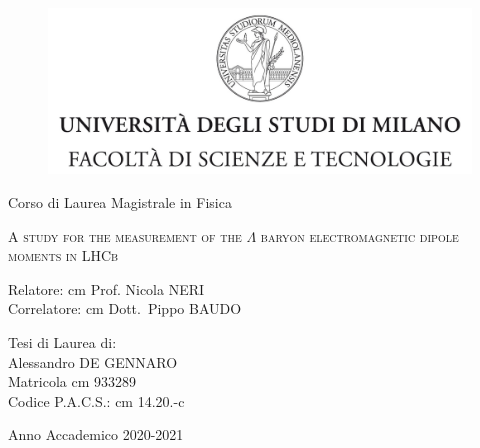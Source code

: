 

\begin{titlepage}
	\begin{figure}[t]
		\centering
		\includegraphics[width=390pt]{graphics/cover-page/logo.jpg}
		\centering
	\end{figure}	
\begin{center}
{\large Corso di Laurea Magistrale in Fisica}
\end{center}

\begin{center}
\vspace{2 cm}
{\Large \textsc{A study for the measurement of the $\Lambda$ baryon electromagnetic
dipole moments in LHCb}\par}
\end{center}
  \vspace{2 cm}
  
  \begin{flushleft}
  		 Relatore:  cm Prof. Nicola NERI\\
		 
  		 \noindent Correlatore:  cm Dott.\ Pippo BAUDO
  \end{flushleft}
  \vspace{1 cm}
  \begin{flushright}
  	Tesi di Laurea di:\\ Alessandro DE GENNARO\\ Matricola  cm 933289\\ Codice P.A.C.S.:  cm 14.20.-c
  \end{flushright}
    	  
\begin{center}
\vspace{2 cm}
{\large Anno Accademico 2020-2021}
\end{center}
\end{titlepage}